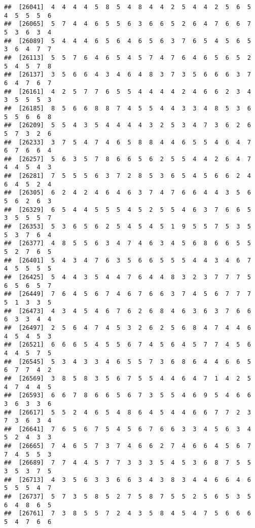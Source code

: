 \documentclass[
]{book}
\begin{document}
\begin{verbatim}
##  [26041]  4  4  4  4  5  8  5  4  8  4  4  2  5  4  4  2  5  6  5  4  5  5  5  6
##  [26065]  5  7  4  4  6  5  5  6  3  6  6  5  2  6  4  7  6  6  7  5  3  6  3  4
##  [26089]  5  4  4  4  6  5  6  4  6  5  6  3  7  6  5  4  5  6  5  3  6  4  7  7
##  [26113]  5  5  7  6  4  6  5  4  5  7  4  7  6  4  6  5  6  5  2  5  4  5  7  8
##  [26137]  3  5  6  6  4  3  4  6  4  8  3  7  3  5  6  6  6  3  7  6  4  7  6  7
##  [26161]  4  2  5  7  7  6  5  5  4  4  4  4  2  4  6  6  2  3  4  3  5  5  5  3
##  [26185]  8  5  6  6  8  8  7  4  5  5  4  4  3  3  4  8  5  3  6  5  5  6  6  8
##  [26209]  5  5  4  3  5  4  4  4  4  3  2  5  3  4  7  3  6  2  6  5  7  3  2  6
##  [26233]  3  7  5  4  7  4  6  5  8  8  4  4  6  5  5  4  6  4  7  6  7  6  6  4
##  [26257]  5  6  3  5  7  8  6  6  5  6  2  5  5  4  4  2  6  4  7  4  4  5  4  3
##  [26281]  7  5  5  5  6  3  7  2  8  5  3  6  5  4  5  6  6  2  4  6  4  5  2  4
##  [26305]  6  2  4  2  4  6  4  6  3  7  4  7  6  6  4  4  3  5  6  5  6  2  6  3
##  [26329]  6  5  4  4  5  5  5  4  5  2  5  5  4  6  3  7  6  6  5  3  5  5  5  7
##  [26353]  5  3  6  5  6  2  5  4  5  4  5  1  9  5  5  7  5  3  5  5  3  7  6  4
##  [26377]  4  8  5  5  6  3  4  7  4  6  3  4  5  6  8  6  6  5  5  5  2  7  6  5
##  [26401]  5  4  3  4  7  6  3  5  6  6  5  5  5  4  4  3  4  6  7  4  5  5  5  5
##  [26425]  5  4  4  3  5  4  4  7  6  4  4  8  3  2  3  7  7  7  5  6  5  6  5  7
##  [26449]  7  6  4  5  6  7  4  6  7  6  6  3  7  4  5  6  7  7  7  5  1  3  3  5
##  [26473]  4  3  4  5  4  6  7  6  2  6  8  4  6  3  6  3  7  6  6  6  3  3  4  4
##  [26497]  2  5  6  4  7  4  5  3  2  6  2  5  6  8  4  7  4  4  6  4  5  4  5  3
##  [26521]  6  6  6  5  4  5  5  6  7  4  5  6  4  5  7  7  4  5  6  4  4  5  7  5
##  [26545]  5  3  4  3  3  4  6  5  5  7  3  6  8  6  4  4  6  6  5  6  7  7  4  2
##  [26569]  3  8  5  8  3  5  6  7  5  5  4  4  6  4  7  1  4  2  5  4  7  4  4  5
##  [26593]  6  6  7  8  6  6  5  6  7  3  5  5  4  6  9  5  4  6  6  3  6  3  3  6
##  [26617]  5  5  2  4  6  5  4  8  6  4  5  4  4  6  6  7  7  2  3  7  3  6  3  4
##  [26641]  7  6  5  6  7  5  4  5  6  7  6  6  3  3  4  5  6  3  4  5  2  4  3  3
##  [26665]  7  4  6  5  7  3  7  4  6  6  2  7  4  6  6  4  5  6  7  7  4  5  5  3
##  [26689]  7  7  4  4  5  7  7  3  3  3  5  4  5  3  6  8  7  5  5  3  5  3  7  5
##  [26713]  4  3  5  6  3  3  6  6  3  4  3  8  3  4  4  6  6  4  6  5  5  5  4  7
##  [26737]  5  7  3  5  8  5  2  7  5  8  7  5  5  2  5  6  5  3  5  6  4  8  6  5
##  [26761]  7  3  8  5  5  7  2  4  3  5  8  4  5  4  7  5  6  6  6  5  4  7  6  6

\end{verbatim}
\end{document}

